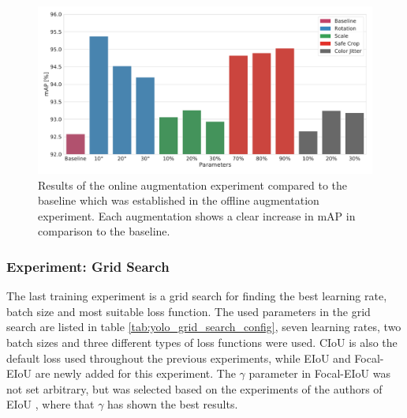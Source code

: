 \begin{figure}
\begin{center}
    \includegraphics[width=16cm]{imgs/yolo_online_aug_experiment.pdf}
    \caption{Results of the online augmentation experiment compared to the baseline which was established in the offline augmentation experiment. Each augmentation shows a clear increase in mAP in comparison to the baseline.}
    \label{fig:yolo_online_aug_results}
\end{center}
\end{figure}

\subsubsection{Experiment: Grid Search}

The last training experiment is a grid search for finding the best learning rate, batch size and most suitable loss function.
The used parameters in the grid search are listed in table \ref{tab:yolo_grid_search_config}, seven learning rates, two batch sizes and three different types of loss functions were used.
\ac{CIoU} is also the default loss used throughout the previous experiments, while \ac{EIoU} and Focal-\ac{EIoU} are newly added for this experiment.
The $\gamma$ parameter in Focal-\ac{EIoU} was not set arbitrary, but was selected based on the experiments of the authors of \ac{EIoU} \cite{eiou}, where that $\gamma$ has shown the best results.

